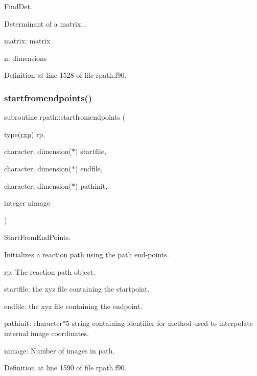 Find\+Det. 

Determinant of a matrix...


\begin{DoxyItemize}
\item matrix\+: matrix
\item n\+: dimensions 
\end{DoxyItemize}

Definition at line 1528 of file rpath.\+f90.

\mbox{\label{namespacerpath_abde80fc3058f25748933e535857b3913}} 
\subsubsection{\texorpdfstring{startfromendpoints()}{startfromendpoints()}}
{\footnotesize\ttfamily subroutine rpath\+::startfromendpoints (\begin{DoxyParamCaption}\item[{type(\mbox{\hyperlink{structrpath_1_1rxp}{rxp}})}]{rp,  }\item[{character, dimension($\ast$)}]{startfile,  }\item[{character, dimension($\ast$)}]{endfile,  }\item[{character, dimension($\ast$)}]{pathinit,  }\item[{integer}]{nimage }\end{DoxyParamCaption})}



Start\+From\+End\+Points. 

Initializes a reaction path using the path end-\/points.


\begin{DoxyItemize}
\item rp\+: The reaction path object.
\item startfile\+: the xyz file containing the startpoint.
\item endfile\+: the xyz file containing the endpoint.
\item pathinit\+: character$\ast$5 string containing identifier for method used to interpolate internal image coordinates.
\item nimage\+: Number of images in path. 
\end{DoxyItemize}

Definition at line 1590 of file rpath.\+f90.

